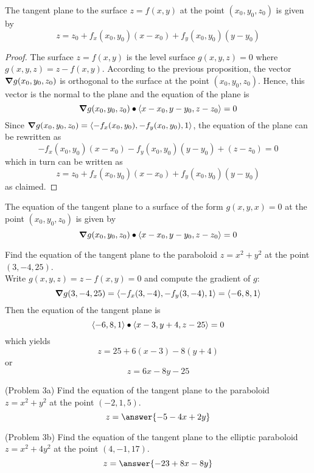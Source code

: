 \documentclass[handout]{ximera}
\begin{document}
\begin{theorem}
The tangent plane to the surface $z = f(x,y)$ at the point $(x_0, y_0, z_0)$ is given by
\[
z = z_0 + f_x(x_0, y_0)(x - x_0) + f_y(x_0, y_0)(y - y_0)
\]
\end{theorem}
\begin{proof}
The surface $z = f(x,y)$ is the level surface $g(x,y,z) = 0$ where $g(x,y,z) = z - f(x,y)$.
According to the previous proposition, the vector $\boldsymbol\nabla g(x_0, y_0, z_0)$ is orthogonal to the surface at the point $(x_0, y_0, z_0)$.
Hence, this vector is the normal to the plane and the equation of the plane is
\[
\boldsymbol\nabla g(x_0, y_0, z_0) \bullet \left\langle x- x_0, y-y_0, z-z_0\right\rangle = 0
\]
Since $\boldsymbol\nabla g(x_0, y_0, z_0) = \left\langle -f_x(x_0, y_0), -f_y(x_0, y_0), 1\right\rangle$, 
the equation of the plane can be rewritten as
\[
-f_x(x_0, y_0)(x-x_0) - f_y(x_0, y_0)(y-y_0) + (z-z_0) = 0
\]
which in turn can be written as
\[
z = z_0 + f_x(x_0, y_0)(x-x_0) + f_y(x_0, y_0)(y-y_0)
\]
as claimed.
\end{proof}

\begin{corollary}
The equation of the tangent plane to a surface of the form $g(x, y, x) = 0$ at the point $(x_0, y_0, z_0)$ is given by
\[
\boldsymbol\nabla g(x_0, y_0, z_0) \bullet \left\langle x - x_0, y - y_0, z - z_0\right\rangle = 0
\]
\end{corollary}

\begin{example}[Example 3]
Find the equation of the tangent plane to the paraboloid $z = x^2 + y^2$ at the point $(3, -4, 25)$.\\
Write $g(x, y, z) = z - f(x,y) = 0$ and compute the gradient of $g$:
\[
\boldsymbol\nabla g(3, -4, 25) = \left\langle -f_x(3, -4), -f_y(3, -4), 1\right\rangle = \left\langle -6, 8, 1\right\rangle
\]
Then the equation of the tangent plane is
\[
\left\langle -6, 8, 1\right\rangle \bullet \left\langle x-3, y+4, z-25\right\rangle = 0
\]
which yields
\[
z = 25 + 6(x-3) - 8(y+4)
\]
or
\[
z = 6x - 8y - 25
\]
\end{example}

\begin{problem}(Problem 3a)
Find the equation of the tangent plane to the paraboloid $z = x^2 + y^2$ at the point $(-2, 1, 5)$.\\
\[
z = \answer{-5-4x+2y}
\]

\end{problem}


\begin{problem}(Problem 3b)
Find the equation of the tangent plane to the elliptic paraboloid $z = x^2 + 4y^2$ at the point $(4, -1, 17)$.\\
\[
z = \answer{-23 + 8x -8y}
\]
\end{problem}
\end{document}
